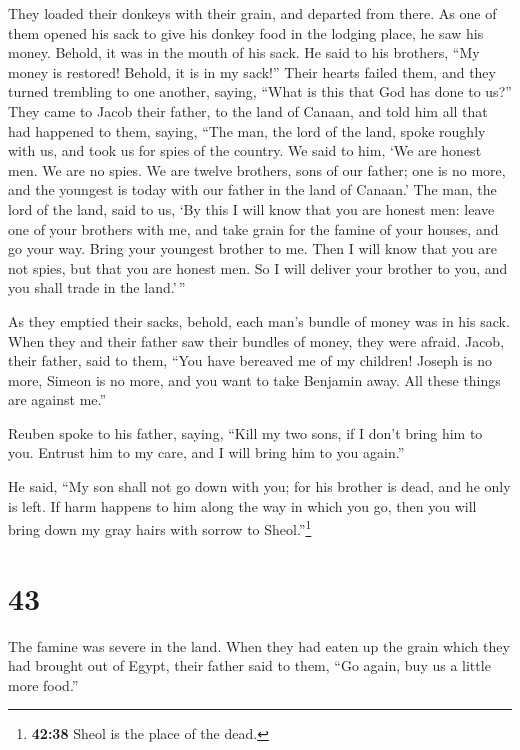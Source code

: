 They loaded their donkeys with their grain, and departed
from there.  As one of them opened his sack to give his
donkey food in the lodging place, he saw his money. Behold, it was in
the mouth of his sack.  He said to his brothers, ``My
money is restored! Behold, it is in my sack!'' Their hearts failed them,
and they turned trembling to one another, saying, ``What is this that
God has done to us?''  They came to Jacob their father,
to the land of Canaan, and told him all that had happened to them,
saying,  ``The man, the lord of the land, spoke roughly
with us, and took us for spies of the country.  We said
to him, `We are honest men. We are no spies.  We are
twelve brothers, sons of our father; one is no more, and the youngest is
today with our father in the land of Canaan.'  The man,
the lord of the land, said to us, `By this I will know that you are
honest men: leave one of your brothers with me, and take grain for the
famine of your houses, and go your way.  Bring your
youngest brother to me. Then I will know that you are not spies, but
that you are honest men. So I will deliver your brother to you, and you
shall trade in the land.'\,''

 As they emptied their sacks, behold, each man's bundle
of money was in his sack. When they and their father saw their bundles
of money, they were afraid.  Jacob, their father, said to
them, ``You have bereaved me of my children! Joseph is no more, Simeon
is no more, and you want to take Benjamin away. All these things are
against me.''

 Reuben spoke to his father, saying, ``Kill my two sons,
if I don't bring him to you. Entrust him to my care, and I will bring
him to you again.''

 He said, ``My son shall not go down with you; for his
brother is dead, and he only is left. If harm happens to him along the
way in which you go, then you will bring down my gray hairs with sorrow
to Sheol.''\footnote{\textbf{42:38} Sheol is the place of the dead.}

\hypertarget{section-42}{%
\section{43}\label{section-42}}

 The famine was severe in the land.  When
they had eaten up the grain which they had brought out of Egypt, their
father said to them, ``Go again, buy us a little more food.''

